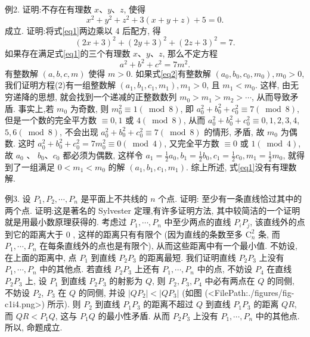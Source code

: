 例2. 证明:不存在有理数 $x 、 y 、 z$, 使得
$$
x^2+y^2+z^2+3(x+y+z)+5=0 . \label{eq1}
$$
成立.
证明:将式\ref{eq1}两边乘以 4 后配方, 得
$$
(2 x+3)^2+(2 y+3)^2+(2 z+3)^2=7 .
$$
如果存在满足式\ref{eq1}的三个有理数 $x 、 y 、 z$, 那么不定方程
$$
a^2+b^2+c^2=7 m^2 . \label{eq2}
$$
有整数解 $(a, b, c, m)$ 使得 $m>0$.
如果式\ref{eq2}有整数解 $\left(a_0, b_0, c_0, m_0\right), m_0>0$, 我们证明方程(2)有一组整数解 $\left(a_1, b_1, c_1, m_1\right), m_1>0$, 且 $m_1<m_0$. 这样, 由无穷递降的思想, 就会找到一个递减的正整数数列 $m_0>m_1>m_2>\cdots$, 从而导致矛盾.
事实上,若 $m_0$ 为奇数, 则 $m_0^2 \equiv 1(\bmod 8)$, 即 $a_0^2+b_0^2+c_0^2 \equiv 7(\bmod 8)$, 但是一个数的完全平方数 $\equiv 0,1$ 或 $4(\bmod 8)$, 从而 $a_0^2+b_0^2+c_0^2 \equiv 0,1,2,3,4$, $5,6(\bmod 8)$, 不会出现 $a_0^2+b_0^2+c_0^2 \equiv 7(\bmod 8)$ 的情形, 矛盾, 故 $m_0$ 为偶数.
这时 $a_0^2+b_0^2+c_0^2=7 m_0^2 \equiv 0(\bmod 4)$, 又完全平方数 $\equiv 0$ 或 $1(\bmod 4)$, 故 $a_0$ 、 $b_0 、 c_0$ 都必须为偶数, 这样令 $a_1=\frac{1}{2} a_0, b_1=\frac{1}{2} b_0, c_1=\frac{1}{2} c_0, m_1=\frac{1}{2} m_0$, 就得到了一组满足 $0<m_1<m_0$ 的解 $\left(a_1, b_1, c_1, m_1\right)$.
综上所述, 式\ref{eq1}没有有理数解.



例3. 设 $P_1, P_2, \cdots, P_n$ 是平面上不共线的 $n$ 个点.
证明: 至少有一条直线恰过其中的两个点.
证明:这是著名的 Sylvester 定理,有许多证明方法, 其中较简洁的一个证明就是用最小数原理获得的.
考虑过 $P_1, \cdots, P_n$ 中至少两点的直线 $P_i P_j$, 该直线外的点到它的距离大于 0 , 这样的距离只有有限个 (因为直线的条数至多 $\mathrm{C}_n^2$ 条, 而 $P_1, \cdots, P_n$ 在每条直线外的点也是有限个), 从而这些距离中有一个最小值.
不妨设,在上面的距离中, 点 $P_1$ 到直线 $P_2 P_3$ 的距离最短.
我们证明直线 $P_2 P_3$ 上没有 $P_1, \cdots, P_n$ 中的其他点.
若直线 $P_2 P_3$ 上还有 $P_1, \cdots, P_n$ 中的点, 不妨设 $P_4$ 在直线 $P_2 P_3$ 上, 设 $P_1$ 到直线 $P_2 P_3$ 的射影为 $Q$, 则 $P_2, P_3, P_4$ 中必有两点在 $Q$ 的同侧, 不妨设 $P_2$, $P_3$ 在 $Q$ 的同侧, 并设 $\left|Q P_2\right|<\left|Q P_3\right|$ (如图 (<FilePath:./figures/fig-c1i4.png>) 所示). 则 $P_2$ 到直线 $P_1 P_3$ 的距离不超过 $Q$ 到直线 $P_1 P_3$ 的距离 $Q R$, 而 $Q R<P_1 Q$, 这与 $P_1 Q$ 的最小性矛盾.
从而 $P_2 P_3$ 上没有 $P_1, \cdots, P_n$ 中的其他点.
所以, 命题成立.



